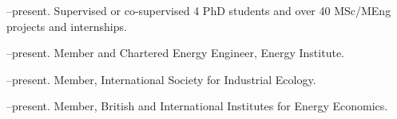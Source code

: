 \documentclass[11pt,a4paper]{article}
\begin{document}
--present. Supervised or co-supervised 4 PhD students and over 40 MSc/MEng projects and internships.

\bigskip




\noindent{}%
%
--present.  Member and Chartered Energy Engineer, Energy Institute.

--present.  Member, International Society for Industrial Ecology.

--present.  Member, British and International Institutes for Energy Economics.
\end{document}
